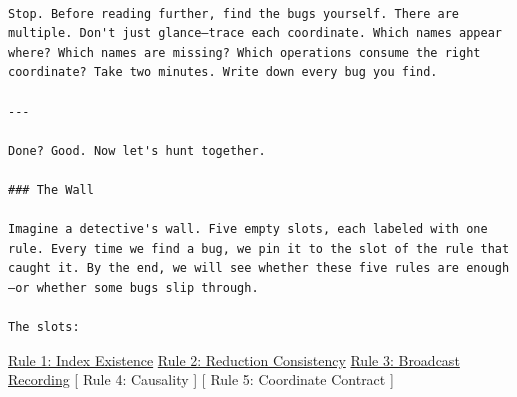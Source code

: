 \documentclass[11pt,titlepage]{article}
\begin{document}
\begin{verbatim}

Stop. Before reading further, find the bugs yourself. There are multiple. Don't just glance—trace each coordinate. Which names appear where? Which names are missing? Which operations consume the right coordinate? Take two minutes. Write down every bug you find.

---

Done? Good. Now let's hunt together.

### The Wall

Imagine a detective's wall. Five empty slots, each labeled with one rule. Every time we find a bug, we pin it to the slot of the rule that caught it. By the end, we will see whether these five rules are enough—or whether some bugs slip through.

The slots:
\end{verbatim}

\protect\hyperlink{rule-1-index-existence}{Rule 1: Index Existence}
\protect\hyperlink{rule-2-reduction-consistency}{Rule 2: Reduction
Consistency} \protect\hyperlink{rule-3-broadcast-recording}{Rule 3:
Broadcast Recording} {[} Rule 4: Causality {]} {[} Rule 5: Coordinate
Contract {]}
\end{document}
